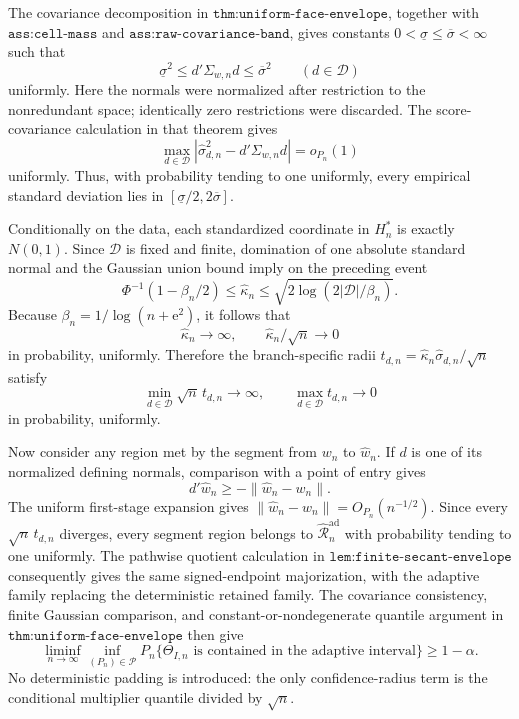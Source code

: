 The covariance decomposition in \(\texttt{thm:uniform-face-envelope}\), together with \(\texttt{ass:cell-mass}\) and \(\texttt{ass:raw-covariance-band}\), gives constants \(0<\underline\sigma\le\overline\sigma<\infty\) such that
\[
 \underline\sigma^2\le d'\Sigma_{w,n}d\le\overline\sigma^2
 \qquad(d\in\mathcal D)
\]
uniformly. Here the normals were normalized after restriction to the nonredundant space; identically zero restrictions were discarded. The score-covariance calculation in that theorem gives
\[
 \max_{d\in\mathcal D}
 |\widehat\sigma_{d,n}^2-d'\Sigma_{w,n}d|=o_{P_n}(1)
\]
uniformly. Thus, with probability tending to one uniformly, every empirical standard deviation lies in
\([\underline\sigma/2,2\overline\sigma]\).

Conditionally on the data, each standardized coordinate in \(H_n^*\) is exactly \(N(0,1)\). Since \(\mathcal D\) is fixed and finite, domination of one absolute standard normal and the Gaussian union bound imply on the preceding event
\[
 \Phi^{-1}(1-\beta_n/2)
 \le\widehat\kappa_n
 \le\sqrt{2\log(2|\mathcal D|/\beta_n)}.
\]
Because \(\beta_n=1/\log(n+\mathrm e^2)\), it follows that
\[
 \widehat\kappa_n\longrightarrow\infty,
 \qquad
 \widehat\kappa_n/\sqrt n\longrightarrow0
\]
in probability, uniformly. Therefore the branch-specific radii
\(t_{d,n}=\widehat\kappa_n\widehat\sigma_{d,n}/\sqrt n\) satisfy
\[
 \min_{d\in\mathcal D}\sqrt n\,t_{d,n}\longrightarrow\infty,
 \qquad
 \max_{d\in\mathcal D}t_{d,n}\longrightarrow0
\]
in probability, uniformly.

Now consider any region met by the segment from \(w_n\) to \(\widehat w_n\). If \(d\) is one of its normalized defining normals, comparison with a point of entry gives
\[
 d'\widehat w_n\ge-\lVert\widehat w_n-w_n\rVert.
\]
The uniform first-stage expansion gives
\(\lVert\widehat w_n-w_n\rVert=O_{P_n}(n^{-1/2})\). Since every \(\sqrt n\,t_{d,n}\) diverges, every segment region belongs to \(\widehat{\mathcal R}_n^{\mathrm{ad}}\) with probability tending to one uniformly. The pathwise quotient calculation in \(\texttt{lem:finite-secant-envelope}\) consequently gives the same signed-endpoint majorization, with the adaptive family replacing the deterministic retained family. The covariance consistency, finite Gaussian comparison, and constant-or-nondegenerate quantile argument in \(\texttt{thm:uniform-face-envelope}\) then give
\[
 \liminf_{n\to\infty}\inf_{(P_n)\in\mathcal P}
 P_n\{\Theta_{I,n}\text{ is contained in the adaptive interval}\}
 \ge1-\alpha.
\]
No deterministic padding is introduced: the only confidence-radius term is the conditional multiplier quantile divided by \(\sqrt n\).

